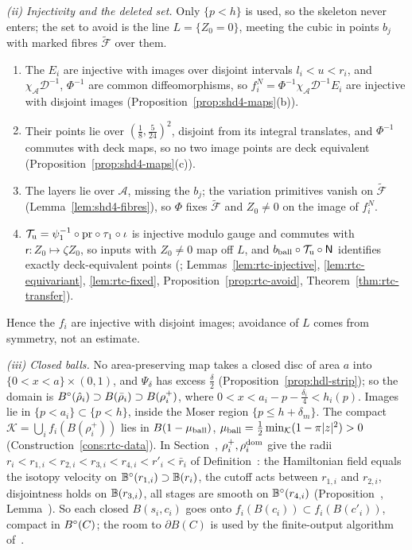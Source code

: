 \emph{(ii) Injectivity and the deleted set.} Only $\{p<h\}$ is used, so the skeleton never enters; the set to avoid is the line $L=\{Z_0=0\}$, meeting the cubic in points $b_j$ with marked fibres $\widetilde{\mathcal F}$ over them.
\begin{enumerate}[label=(\alph*)]
\item The $E_i$ are injective with images over disjoint intervals $l_i<u<r_i$, and $\chi_{\mathcal A}\mathcal D^{-1}$, $\Phi^{-1}$ are common diffeomorphisms, so $f^N_i=\Phi^{-1}\chi_{\mathcal A}\mathcal D^{-1}E_i$ are injective with disjoint images (Proposition~\ref{prop:shd4-maps}(b)).
\item Their points lie over $(\frac18,\frac5{24})^2$, disjoint from its integral translates, and $\Phi^{-1}$ commutes with deck maps, so no two image points are deck equivalent (Proposition~\ref{prop:shd4-maps}(c)).
\item The layers lie over $\mathcal A$, missing the $b_j$; the variation primitives vanish on $\widetilde{\mathcal F}$ (Lemma~\ref{lem:shd4-fibres}), so $\Phi$ fixes $\widetilde{\mathcal F}$ and $Z_0\ne0$ on the image of $f^N_i$.
\item $\mathcal T_{\rm u}=\psi_1^{-1}\circ\mathrm{pr}\circ\tau_1\circ\iota$ is injective modulo gauge and commutes with $\mathsf r\colon Z_0\mapsto\zeta Z_0$, so inputs with $Z_0\ne0$ map off $L$, and $b_{\rm ball}\circ\mathcal T_{\rm u}\circ\mathsf N$ identifies exactly deck-equivalent points (; Lemmas~\ref{lem:rtc-injective}, \ref{lem:rtc-equivariant}, \ref{lem:rtc-fixed}, Proposition~\ref{prop:rtc-avoid}, Theorem~\ref{thm:rtc-transfer}).
\end{enumerate}
Hence the $f_i$ are injective with disjoint images; avoidance of $L$ comes from symmetry, not an estimate.

\emph{(iii) Closed balls.} No area-preserving map takes a closed disc of area $a$ into $\{0<x<a\}\times(0,1)$, and $\Psi_\delta$ has excess $\frac\delta2$ (Proposition~\ref{prop:hdl-strip}); so the domain is $B^{\circ}(\hat\rho_i)\supset B(\bar\rho_i)\supset B(\rho_i^+)$, where $0<x<a_i-p-\frac{\delta_i}4<h_i(p)$. Images lie in $\{p<a_i\}\subset\{p<h\}$, inside the Moser region $\{p\le h+\delta_m\}$. The compact $\mathcal K=\bigcup_if_i(B(\rho_i^+))$ lies in $B(1-\mu_{\rm ball})$, $\mu_{\rm ball}=\frac12\min_{\mathcal K}(1-\pi|z|^2)>0$ (Construction~\ref{cons:rtc-data}). In Section~, $\rho_i^+,\rho_i^{\rm dom}$ give the radii $r_i<r_{1,i}<r_{2,i}<r_{3,i}<r_{4,i}<r'_i<\bar r_i$ of Definition~: the Hamiltonian field equals the isotopy velocity on $\mathbb{B}^\circ(r_{1,i})\supset\mathbb{B}(r_i)$, the cutoff acts between $r_{1,i}$ and $r_{2,i}$, disjointness holds on $\mathbb{B}(r_{3,i})$, all stages are smooth on $\mathbb{B}^\circ(r_{4,i})$ (Proposition~, Lemma~). So each closed $B(s_i,c_i)$ goes onto $f_i(B(c_i))\subset f_i(B(c'_i))$, compact in $B^{\circ}(C)$; the room to $\partial B(C)$ is used by the finite-output algorithm of~\cite{SongHD}.

